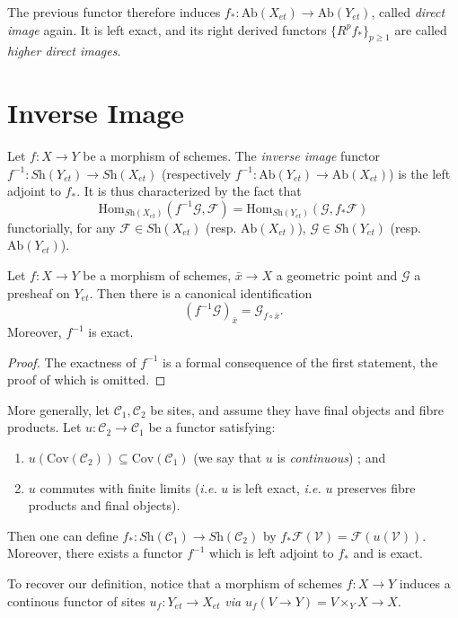 \begin{definition}
The previous functor therefore induces $f_*:\text{Ab}(X_{et})\to 
\text{Ab}(Y_{et})$, called \emph{direct image} again. It is left exact, and its 
right derived functors $\{R^pf_*\}_{p \geq 1}$ are called \emph{higher direct 
images}.  
\end{definition}
	
\section{Inverse Image}
\label{section-inverse-image}

\begin{definition}
Let $f: X\to Y$ be a morphism of schemes. The \emph{inverse image} functor  
$f^{-1} : \textit{Sh}(Y_{et})\to \textit{Sh}(X_{et})$ (respectively $f^{-1}: 
\text{Ab}(Y_{et}) \to \text{Ab}(X_{et})$) is the left adjoint to $f_*$. It is 
thus characterized by the fact that 
$$
\text{Hom}_{{\textit{Sh}(X_{et})}} (f^{-1}\mathcal{G}, \mathcal{F}) = 
\text{Hom}_{\textit{Sh}(Y_{et})} (\mathcal{G}, f_*\mathcal{F}) 
$$
functorially, for any $\mathcal{F} \in \textit{Sh}(X_{et})$ (resp. 
$\text{Ab}(X_{et})$), $\mathcal{G} \in \textit{Sh}(Y_{et})$ (resp. 
$\text{Ab}(Y_{et})$).
\end{definition}

\begin{lemma} 
Let $f : X \to Y$ be a morphism of schemes, $\bar x \to X$ a geometric point 
and $\mathcal{G}$ a presheaf on $Y_{et}$. Then there is a canonical 
identification 
$$
\left(f^{-1}\mathcal{G}\right)_{\bar x} = \mathcal{G}_{f\circ \bar x}.
$$
Moreover, $f^{-1}$ is exact.
\end{lemma}

\begin{proof}
The exactness of $f^{-1}$ is a formal consequence of the first statement, the 
proof of which is omitted.
\end{proof}
	
\begin{remark}
More generally, let $\mathcal{C}_1, \mathcal{C}_2$ be sites, and assume they 
have final objects and fibre products.  Let  $u: \mathcal{C}_2 \to 
\mathcal{C}_1$ be a functor satisfying:
\begin{enumerate}
\item $u (\text{Cov}(\mathcal{C}_2)) \subseteq \text{Cov}(\mathcal{C}_1)$ (we 
say that $u$ is \emph{continuous}) ; and
\item $u$ commutes with finite limits ({\it i.e.} $u$ is left exact, {\it i.e.} 
$u$ preserves fibre products and final objects).
\end{enumerate}
Then one can define $f_*: \textit{Sh}(\mathcal{C}_1) \to 
\textit{Sh}(\mathcal{C}_2)$ by $ f_* \mathcal{F}(\mathcal{V}) = 
\mathcal{F}(u(\mathcal{V}))$. Moreover, there exists a functor $f^{-1}$ which 
is left adjoint to $f_*$ and is exact.

\medskip\noindent
To recover our definition, notice that a morphism of schemes $ f: X  \to Y$ 
induces a continous functor of sites $u_f: Y_{et} \to X_{et}$ {\it via} $u_f (V 
\to Y) = V \times_Y X \to X$.
\end{remark}

